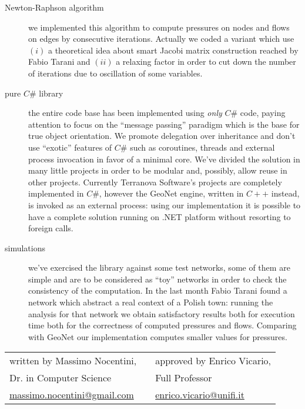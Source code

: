 \documentclass[twoside,openright,titlepage,fleqn,
headinclude,11pt,a4paper,BCOR5mm,footinclude ]{scrbook}
\begin{document}
\begin{description}
\item[Newton-Raphson algorithm] we implemented this algorithm to compute
pressures on nodes and flows on edges by consecutive iterations. 
Actually we coded a variant which use
$(i)$ a theoretical idea about smart Jacobi matrix construction reached by Fabio
Tarani and $(ii)$ a relaxing factor in order to cut down the number of
iterations due to oscillation of some variables.

\item[pure $C\#$ library] the entire code base has been implemented using
\emph{only} $C\#$ code, paying attention to focus on the ``message passing''
paradigm which is the base for true object orientation. We promote delegation
over inheritance and don't use ``exotic'' features of $C\#$
such as coroutines, threads and external process invocation in favor of a 
minimal core. We've divided the solution in many little projects in order to be 
modular and, possibly, allow reuse in other projects. Currently
Terranova Software's projects are completely implemented in $C\#$, however
 the GeoNet engine, written in $C++$ instead, is invoked as an external
process: using our implementation it is possible to have a complete solution running 
on .NET platform without resorting to foreign calls.

\item[simulations] we've exercised the library against some test networks, some
of them are simple and are to be considered as ``toy'' networks in order to
check the consistency of the computation. In the last month Fabio Tarani found a
network which abstract a real context of a Polish town: running the analysis for
that network we obtain satisfactory results both for execution time both for the
correctness of computed pressures and flows. Comparing with GeoNet our
implementation computes smaller values for pressures.
\end{description}

\begin{tabular}{ l c l }
  written by Massimo Nocentini,  &  & approved by Enrico Vicario,  \\
  Dr. in Computer Science & & Full Professor \\
  \url{massimo.nocentini@gmail.com} &  & \url{enrico.vicario@unifi.it} \\
\end{tabular}
\end{document}
